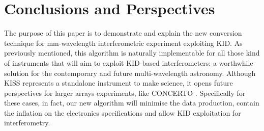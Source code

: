 \documentclass[twocolumn,traditabstract]{aa}\\
\begin{document}
\section{Conclusions and Perspectives}
\label{sec:conclu}
The purpose of this paper is to demonstrate and explain the new conversion technique for mm-wavelength interferometric experiment exploiting KID. As previously mentioned, this algorithm is naturally implementable for all those kind of instruments that will aim to exploit KID-based interferometers: a worthwhile solution for the contemporary and future multi-wavelength astronomy. Although KISS represents a standalone instrument to make science, it opens future perspectives for larger arrays experiments, like CONCERTO \cite{concerto}. Specifically for these cases, in fact, our new algorithm will minimise the data production, contain the inflation on the electronics specifications and allow KID exploitation for interferometry.

%

\printbibliography
\end{document}
